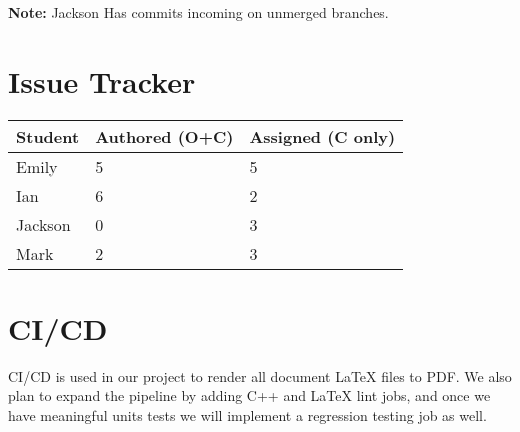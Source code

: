 \documentclass{article}
\begin{document}
\textbf{Note:} Jackson Has commits incoming on unmerged branches.

\section{Issue Tracker}

\begin{table}[H]
\centering
\begin{tabular}{lll}
\toprule
\textbf{Student} & \textbf{Authored (O+C)} & \textbf{Assigned (C only)}\\
\midrule
Emily & 5 & 5 \\
Ian & 6 & 2 \\
Jackson & 0 & 3 \\
Mark & 2 & 3 \\
\bottomrule
\end{tabular}
\end{table}




\section{CI/CD}
CI/CD is used in our project to render all document LaTeX files to PDF. We also 
plan to expand the pipeline by adding C++ and LaTeX lint jobs, and once we have 
meaningful units tests we will implement a regression testing job as well.
\end{document}
